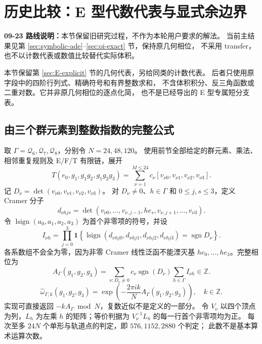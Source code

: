 \section{历史比较：E 型代数代表与显式余边界}\label{sec:E-algebraic}

\noindent\textbf{09-23 路线说明：}本节保留旧研究过程，不作为本轮用户要求的解法。
当前主结果见第 \ref{sec:symbolic-ade}--\ref{sec:oi-exact} 节，保持原几何相位，
不采用 transfer，也不以计数代表或数值比较替代实际体积。

本节保留第 \ref{sec:E-explicit} 节的几何代表，另给同类的计数代表。
后者只使用原字段中的四阶行列式、精确符号和有界整数求和，
不含体积积分、反三角函数或二重对数。它并非原几何相位的逐点化简，
也不是已经导出的 E 型专属短分支表。

\subsection{由三个群元素到整数指数的完整公式}
取 $\Gamma=\mathcal Q_6,\mathcal Q_7,\mathcal Q_8$，分别令 $N=24,48,120$。
使用前节全部给定的群元素、乘法、相邻重复规则及 E/F/T 有限链，展开
\[
T(e_0,g_1,g_1g_2,g_1g_2g_3)
=\sum_{\nu=1}^{M\le24}c_\nu[v_{\nu0},v_{\nu1},v_{\nu2},v_{\nu3}].
\]
记 $D_\nu=\det(v_{\nu0},v_{\nu1},v_{\nu2},v_{\nu3})$。
对 $D_\nu\ne0$、$h\in\Gamma$ 和 $0\le j,s\le3$，定义 Cramer 分子
\[
d_{\nu hjs}=\det(v_{\nu0},\ldots,v_{\nu,j-1},he_s,
v_{\nu,j+1},\ldots,v_{\nu3}).
\]
令 $\operatorname{lsign}(a_0,a_1,a_2,a_3)$ 为首个非零项的符号，并设
\begin{equation}
I_{\nu h}=\prod_{j=0}^3\mathbf1\!\left\{
\operatorname{lsign}(d_{\nu hj0},d_{\nu hj1},d_{\nu hj2},d_{\nu hj3})
=\operatorname{sgn}D_\nu\right\}.
\label{eq:count-indicator}
\end{equation}
各系数组不会全为零，因为非零 Cramer 线性泛函不能湮灭基
$he_0,\ldots,he_3$。完整相位为
\begin{equation}
A_\Gamma(g_1,g_2,g_3)
=\sum_{\nu:D_\nu\ne0}c_\nu\operatorname{sgn}(D_\nu)
\sum_{h\in\Gamma}I_{\nu h}\in\mathbb Z.\label{eq:count-integer}
\end{equation}
\begin{equation}
\boxed{\widehat\omega_{\Gamma,k}(g_1,g_2,g_3)
=\exp\left(-\frac{2\pi i k}{N}A_\Gamma(g_1,g_2,g_3)\right),
\quad k\in\mathbb Z.}\label{eq:count-phase}
\end{equation}
实现可直接返回 $-kA_\Gamma\bmod N$，复数近似不是定义的一部分。
令 $V_\nu$ 以四个顶点为列，$L_h$ 为左乘 $h$ 的矩阵；等价判据为
$V_\nu^{-1}L_h$ 的每一行首个非零项均为正。
每次至多 $24N$ 个单形与轨道点的判定，即 $576,1152,2880$ 个判定；
此数不是基本算术运算次数。

